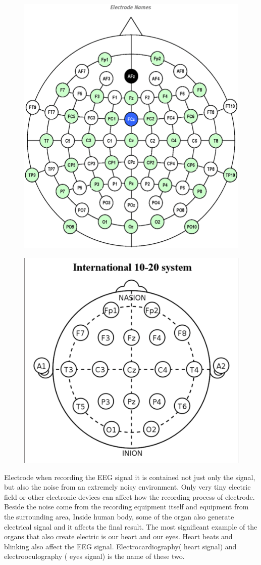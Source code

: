     \begin{figure}
    \centering
    \begin{minipage}{.5\textwidth}
      \centering
      \includegraphics[width=.6\linewidth]{images/EEG_electrodes_map_full.png}
      \label{fig:fulle}
    \end{minipage}%
    \begin{minipage}{.5\textwidth}
      \centering
      \includegraphics[width=.7\linewidth]{images/EEG_electrodes_map_19.png}
      \label{fig:19e}
    \end{minipage}
    \end{figure}

    Electrode when recording the EEG signal it is contained not just only the signal, but also the noise from an extremely noisy environment. Only very tiny electric field or other electronic devices can affect how the recording process of electrode. Beside the noise come from the recording equipment itself and equipment from the surrounding area, Inside human body, some of the organ also generate electrical signal and it affects the final result. The most significant example of the organs that also create electric is our heart and our eyes. Heart beats and blinking also affect the EEG signal. Electrocardiography( heart signal) and electrooculography ( eyes signal) is the name of these two.

